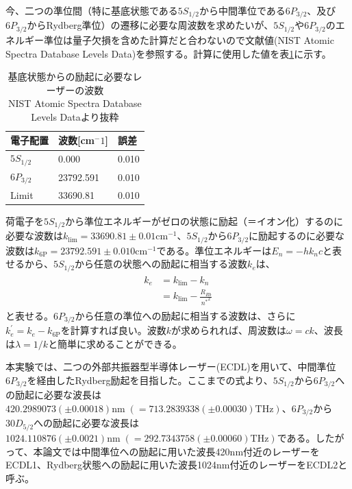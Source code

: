 \documentclass[dvipdfmx]{jsreport}
\begin{document}
今、二つの準位間（特に基底状態である$5S_{1/2}$から中間準位である$6P_{3/2}$、及び$6P_{3/2}$からRydberg準位）の遷移に必要な周波数を求めたいが、$5S_{1/2}$や$6P_{3/2}$のエネルギー準位は量子欠損を含めた計算だと合わないので文献値\cite{nist}(NIST Atomic Spectra Database Levels Data)を参照する。計算に使用した値を表\ref{table:nist}に示す。
\begin{table}[hbtp]
  \caption{基底状態からの励起に必要なレーザーの波数 \\
  NIST Atomic Spectra Database Levels Data\cite{nist}より抜粋}
  \label{table:nist}
  \centering
  \begin{tabular}{lll}
    \hline
    電子配置  & 波数[cm$^-1$] & 誤差 \\
    \hline
    \hline
    $5S_{1/2}$ & 0.000 & 0.010 \\
    $6P_{3/2}$ & 23792.591 & 0.010 \\
    Limit & 33690.81 & 0.010 \\
    \hline
  \end{tabular}
\end{table}

荷電子を$5S_{1/2}$から準位エネルギーがゼロの状態に励起（＝イオン化）するのに必要な波数は$k_{\text{lim}} = 33690.81 \pm 0.01\text{cm}^{-1}$、$5S_{1/2}$から$6P_{3/2}$に励起するのに必要な波数は$k_{\text{6P}} = 23792.591 \pm 0.010\text{cm}^{-1}$である。準位エネルギーは$E_n = -hk_nc$と表せるから、$5S_{1/2}$から任意の状態への励起に相当する波数$k_e$は、
\begin{align}
\begin{split}
\label{rydberg-frequency}
k_e &= k_{\text{lim}} - k_n \\
&= k_{\text{lim}} - \frac{R_{Rb}}{{n^*}^2}
\end{split}
\end{align}
と表せる。$6P_{3/2}$から任意の準位への励起に相当する波数は、さらに$k_e^{'} = k_e - k_{\text{6P}}$を計算すれば良い。波数$k$が求められれば、周波数は$\omega = ck$、波長は$\lambda = 1 / k$と簡単に求めることができる。

本実験では、二つの外部共振器型半導体レーザー(ECDL)を用いて、中間準位$6P_{3/2}$を経由したRydberg励起を目指した。ここまでの式より、$5S_{1/2}$から$6P_{3/2}$への励起に必要な波長は$420.2989073(\pm 0.00018)\text{nm}\; \left(= 713.2839338(\pm 0.00030)\text{THz} \right)$、$6P_{3/2}$から$30D_{5/2}$への励起に必要な波長は$1024.110876(\pm 0.0021)\text{nm}\; \left(= 292.7343758(\pm 0.00060)\text{THz} \right)$である。したがって、本論文では中間準位への励起に用いた波長420nm付近のレーザーをECDL1、Rydberg状態への励起に用いた波長1024nm付近のレーザーをECDL2と呼ぶ。
\end{document}
